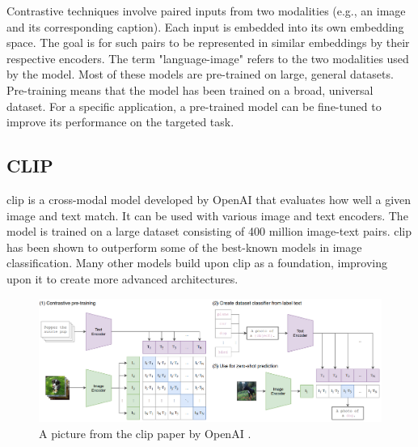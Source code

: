        Contrastive techniques involve paired inputs from two modalities (e.g., an image and its corresponding caption). 
        Each input is embedded into its own embedding space. 
        The goal is for such pairs to be represented in similar embeddings by their respective encoders. 
        The term "language-image" refers to the two modalities used by the model. 
        Most of these models are pre-trained on large, general datasets. 
        Pre-training means that the model has been trained on a broad, universal dataset. 
        For a specific application, a pre-trained model can be fine-tuned to improve its performance on the targeted task.



        \subsection{CLIP
            \label{section:clip}}
        \acrfull{clip} \cite{clip} is a cross-modal model developed by OpenAI \cite{openai} that evaluates how well a given image and text match. 
        It can be used with various image and text encoders. 
        The model is trained on a large dataset consisting of 400 million image-text pairs. 
        \acrshort{clip} has been shown to outperform some of the best-known models in image classification. 
        Many other models build upon \acrshort{clip} as a foundation, improving upon it to create more advanced architectures.
            

        \begin{figure}[]
            \centering
            \includegraphics[width=\textwidth]{Images/crossmodalnetworks/OpenAICLIP.png}
            \caption{A picture from the \acrshort{clip} paper by OpenAI \cite{clip}.}
            \label{fig:crossmodalnetworks:openaiclip}
        \end{figure}

